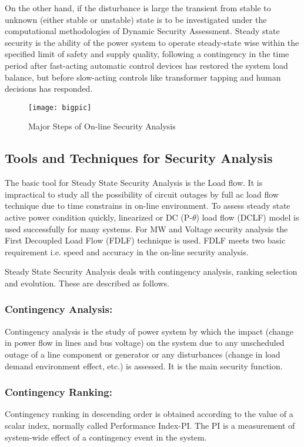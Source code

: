 \documentclass[a4paper,11pt]{article}
\begin{document}
On the other hand, if the disturbance is large the transient from stable to unknown (either stable or unstable) state is to be investigated under the computational methodologies of Dynamic Security Assessment. Steady state security is the ability of the power system to operate steady-state wise within the specified limit of safety and supply quality, following a contingency in the time period after fast-acting automatic control devices has restored the system load balance, but before slow-acting controls like transformer tapping and human decisions has responded.

\begin{figure}[p]
\centering
\texttt{[image: bigpic]}
\caption{Major Steps of On-line Security Analysis} \label{1.2}
\end{figure}

\subsection{Tools and Techniques for Security Analysis}
The basic tool for Steady State Security Analysis is the Load flow. It is impractical to study all the possibility of circuit outages by full ac load flow technique due to time constrains in on-line environment. To assess steady state active power condition quickly, linearized or DC (P-$\theta$) load flow (DCLF) model is used successfully for many systems. For MW and Voltage security analysis the First Decoupled Load Flow (FDLF) technique is used. FDLF meets two basic requirement i.e. speed and accuracy in the on-line security analysis.

Steady State Security Analysis deals with contingency analysis, ranking selection and evolution. These are described as follows.

\subsubsection{Contingency Analysis:}
Contingency analysis is the study of power system by which the impact (change in power flow in lines and bus voltage) on the system due to any unscheduled outage of a line component or generator or any disturbances (change in load demand environment effect, etc.) is assessed. It is the main security function.

\subsubsection{Contingency Ranking:}
Contingency ranking in descending order is obtained according to the value of a scalar index, normally called Performance Index-PI. The PI is a measurement of system-wide effect of a contingency event in the system.
\end{document}
